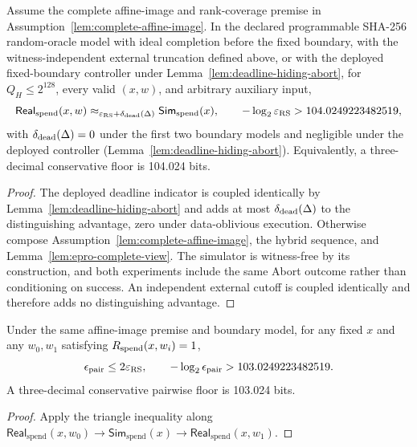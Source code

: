 \begin{theorem}
\label{thm:real-vs-sim23}
Assume the complete affine-image and rank-coverage premise in
Assumption~\ref{lem:complete-affine-image}.  In the declared programmable
SHA-256 random-oracle model with ideal completion before the fixed boundary,
with the witness-independent external truncation defined above, or with the
deployed fixed-boundary controller under
Lemma~\ref{lem:deadline-hiding-abort}, for \(Q_H\le2^{128}\), every valid
\((x,w)\), and arbitrary auxiliary input,
\[
 \mathsf{Real}_{\mathrm{spend}}(x,w)
 \approx_{\varepsilon_{\rm RS}+\delta_{\rm dead}(\Delta)}
 \mathsf{Sim}_{\mathrm{spend}}(x),
 \qquad
 -\log_2\varepsilon_{\rm RS}>104.0249223482519,
\]
with \(\delta_{\rm dead}(\Delta)=0\) under the first two boundary models and
negligible under the deployed controller (Lemma~\ref{lem:deadline-hiding-abort}).
Equivalently, a three-decimal conservative floor is 104.024 bits.
\end{theorem}

\begin{proof}
The deployed deadline indicator is coupled identically by
Lemma~\ref{lem:deadline-hiding-abort} and adds at most
\(\delta_{\rm dead}(\Delta)\) to the distinguishing advantage, zero under
data-oblivious execution.  Otherwise
compose Assumption~\ref{lem:complete-affine-image}, the hybrid sequence, and
Lemma~\ref{lem:epro-complete-view}.  The simulator is witness-free by its
construction, and both experiments include the same Abort outcome rather
than conditioning on success.  An independent external cutoff is coupled
identically and therefore adds no distinguishing advantage.
\end{proof}

\begin{corollary}
\label{cor:pairwise-hiding}
Under the same affine-image premise and boundary model, for any fixed \(x\)
and any \(w_0,w_1\) satisfying \(R_{\mathrm{spend}}(x,w_i)=1\),
\[
 \epsilon_{\rm pair}\le2\varepsilon_{\rm RS},
 \qquad
 -\log_2\epsilon_{\rm pair}>103.0249223482519.
\]
A three-decimal conservative pairwise floor is 103.024 bits.
\end{corollary}

\begin{proof}
Apply the triangle inequality along
\(
 \mathsf{Real}_{\mathrm{spend}}(x,w_0)\rightarrow
 \mathsf{Sim}_{\mathrm{spend}}(x)\rightarrow
 \mathsf{Real}_{\mathrm{spend}}(x,w_1)
\).
\end{proof}
